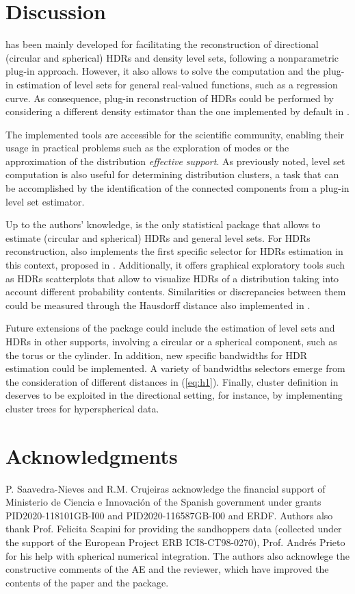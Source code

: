 \section{Discussion}\label{sec:4}
 has been mainly developed for facilitating the reconstruction of directional (circular and spherical) HDRs and density level sets, following a nonparametric plug-in approach. However, it also allows to solve the computation and the plug-in estimation of level sets for general real-valued functions, such as a regression curve. As consequence, plug-in reconstruction of HDRs could be performed by considering a different density estimator than the one implemented by default in . 

The implemented tools are accessible for the scientific community, enabling their usage in practical problems such as the exploration of modes or the approximation of the distribution \textit{effective support}. As previously noted, level set computation is also useful for determining distribution clusters, a task that can be accomplished by the identification of the connected components from a plug-in level set estimator.

Up to the authors' knowledge,  is the only statistical package that allows
to estimate (circular and spherical) HDRs and general level sets. For HDRs reconstruction,  also implements the first specific selector for HDRs estimation in this context, proposed in \cite{saavedra2020nonparametric}. Additionally, it offers graphical exploratory tools such as HDRs scatterplots that allow to visualize HDRs of a distribution taking into account different probability contents. Similarities or discrepancies between them could be measured through the Hausdorff distance also implemented in . 


Future extensions of the  package could include the estimation of level sets and HDRs in other supports, involving a circular or a spherical component, such as the torus or the cylinder. In addition, new specific bandwidths for HDR estimation could be implemented. A variety of bandwidths selectors emerge from the consideration of different distances in (\ref{eq:h1}). Finally, cluster definition in \cite{hartigan1975clustering} deserves to be exploited in the directional setting, for instance, by implementing cluster trees for hyperspherical data.




\section{Acknowledgments}
P. Saavedra-Nieves and R.M. Crujeiras acknowledge the financial support of Ministerio de Ciencia e Innovaci\'on of the Spanish government under grants PID2020-118101GB-I00 and PID2020-116587GB-I00 and ERDF. Authors also thank Prof. Felicita Scapini for providing the sandhoppers data (collected under the support of the European Project ERB ICI8-CT98-0270), Prof. Andrés Prieto for his help with spherical numerical integration. The authors also acknowlege the constructive comments of the AE and the reviewer, which have improved the contents of the paper and the package.

